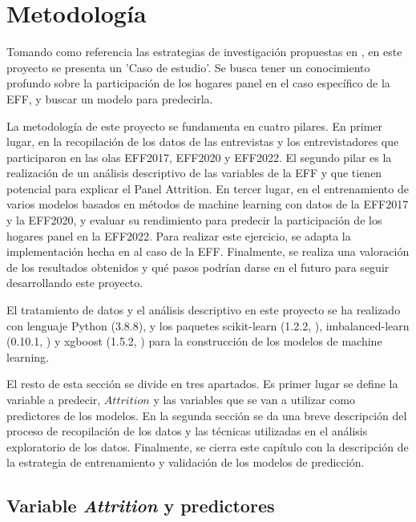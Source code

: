 \chapter{Metodología}
\label{chapter:metodologia}

Tomando como referencia las estrategias de investigación propuestas en \cite{oates2022researching}, en este proyecto se presenta un 'Caso de estudio'. Se busca tener un conocimiento profundo sobre la participación de los hogares panel en el caso específico de la EFF, y buscar un modelo para predecirla.

La metodología de este proyecto se fundamenta en cuatro pilares. En primer lugar, en la recopilación de los datos de las entrevistas y los entrevistadores que participaron en las olas EFF2017, EFF2020 y EFF2022. El segundo pilar es la realización de un análisis descriptivo de las variables de la EFF y que tienen potencial para explicar el Panel Attrition. En tercer lugar, en el entrenamiento de varios modelos basados en métodos de machine learning con datos de la EFF2017 y la EFF2020, y evaluar su rendimiento para predecir la participación de los hogares panel en la EFF2022. Para realizar este ejercicio, se adapta la implementación hecha en \cite{beste2023case} al caso de la EFF. Finalmente, se realiza una valoración de los resultados obtenidos y qué pasos podrían darse en el futuro para seguir desarrollando este proyecto.

El tratamiento de datos y el análisis descriptivo en este proyecto se ha realizado con lenguaje Python (3.8.8), y los paquetes scikit-learn (1.2.2, \cite{pedregosa2011scikit}), imbalanced-learn (0.10.1, \cite{lemaavztre2017imbalanced}) y xgboost (1.5.2, \cite{chen2016xgboost}) para la construcción de los modelos de machine learning.

El resto de esta sección se divide en tres apartados. Es primer lugar se define la variable a predecir, $Attrition$ y las variables que se van a utilizar como predictores de los modelos. En la segunda sección se da una breve descripción del proceso de recopilación de los datos y las técnicas utilizadas en el análisis exploratorio de los datos. Finalmente, se cierra este capítulo con la descripción de la estrategia de entrenamiento y validación de los modelos de predicción.

\section{Variable \textit{Attrition} y predictores}
\label{section:attrition_predictors}

